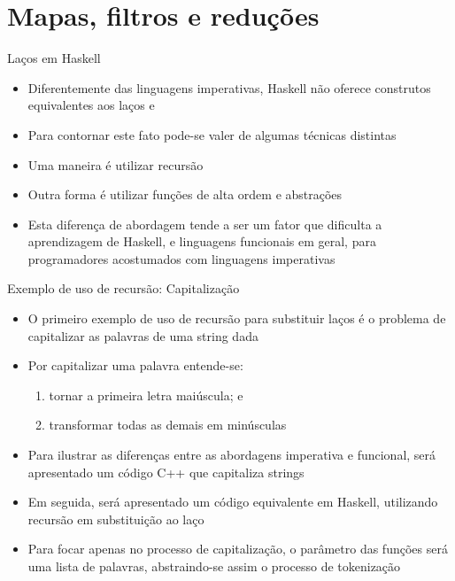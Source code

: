 \section{Mapas, filtros e reduções}

\begin{frame}[fragile]{Laços em Haskell}

    \begin{itemize}
        \item Diferentemente das linguagens imperativas, Haskell não oferece construtos equivalentes
            aos laços  e  

        \item Para contornar este fato pode-se valer de algumas técnicas distintas

        \item Uma maneira é utilizar recursão

        \item Outra forma é utilizar funções de alta ordem e abstrações

        \item Esta diferença de abordagem tende a ser um fator que dificulta a 
            aprendizagem de Haskell, e linguagens funcionais em geral, para programadores
            acostumados com linguagens imperativas

    \end{itemize}

\end{frame}

\begin{frame}[fragile]{Exemplo de uso de recursão: Capitalização}

    \begin{itemize}
        \item O primeiro exemplo de uso de recursão para substituir laços é o problema de
            capitalizar as palavras de uma string dada

        \item Por capitalizar uma palavra entende-se:
        \begin{enumerate}
            \item tornar a primeira letra maiúscula; e
            \item transformar todas as demais em minúsculas
        \end{enumerate}

        \item Para ilustrar as diferenças entre as abordagens imperativa e funcional, será
            apresentado um código C++ que capitaliza strings

        \item Em seguida, será apresentado um código equivalente em Haskell, utilizando
            recursão em substituição ao laço

        \item Para focar apenas no processo de capitalização, o parâmetro das funções será uma
            lista de palavras, abstraindo-se assim o processo de tokenização
    \end{itemize}

\end{frame}

